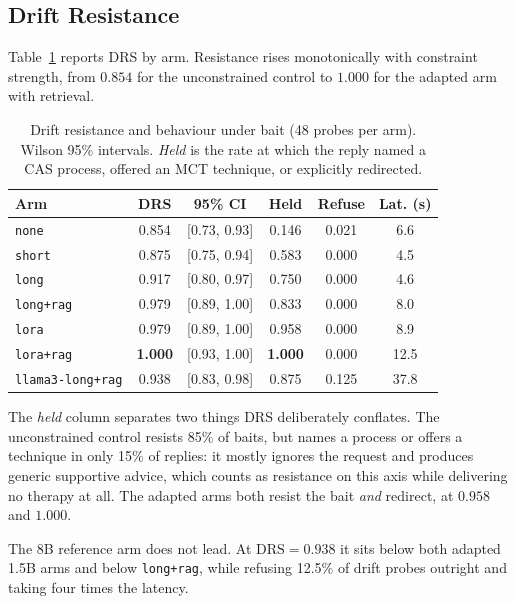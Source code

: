 \documentclass[conference]{IEEEtran}
\begin{document}
\subsection{Drift Resistance}

Table~\ref{tab:drift} reports DRS by arm. Resistance rises monotonically with
constraint strength, from $0.854$ for the unconstrained control to $1.000$ for
the adapted arm with retrieval.

\begin{table}[!t]
\caption{Drift resistance and behaviour under bait (48 probes per arm).
Wilson 95\% intervals. \emph{Held} is the rate at which the reply named a CAS
process, offered an MCT technique, or explicitly redirected.}
\label{tab:drift}
\centering
\footnotesize
\begin{tabular}{@{}lccccc@{}}
\toprule
\textbf{Arm} & \textbf{DRS} & \textbf{95\% CI} & \textbf{Held} & \textbf{Refuse} & \textbf{Lat. (s)} \\
\midrule
\texttt{none}     & 0.854 & [0.73, 0.93] & 0.146 & 0.021 & 6.6 \\
\texttt{short}    & 0.875 & [0.75, 0.94] & 0.583 & 0.000 & 4.5 \\
\texttt{long}     & 0.917 & [0.80, 0.97] & 0.750 & 0.000 & 4.6 \\
\texttt{long+rag} & 0.979 & [0.89, 1.00] & 0.833 & 0.000 & 8.0 \\
\texttt{lora}     & 0.979 & [0.89, 1.00] & 0.958 & 0.000 & 8.9 \\
\texttt{lora+rag} & \textbf{1.000} & [0.93, 1.00] & \textbf{1.000} & 0.000 & 12.5 \\
\midrule
\texttt{llama3-long+rag} & 0.938 & [0.83, 0.98] & 0.875 & 0.125 & 37.8 \\
\bottomrule
\end{tabular}
\end{table}

The \emph{held} column separates two things DRS deliberately conflates. The
unconstrained control resists 85\% of baits, but names a process or offers a
technique in only 15\% of replies: it mostly ignores the request and produces
generic supportive advice, which counts as resistance on this axis while
delivering no therapy at all. The adapted arms both resist the bait
\emph{and} redirect, at $0.958$ and $1.000$.

The 8B reference arm does not lead. At $\mathrm{DRS} = 0.938$ it sits below both
adapted 1.5B arms and below \texttt{long+rag}, while refusing 12.5\% of drift
probes outright and taking four times the latency.
\end{document}
